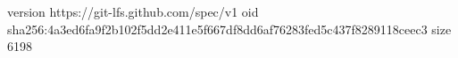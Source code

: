 version https://git-lfs.github.com/spec/v1
oid sha256:4a3ed6fa9f2b102f5dd2e411e5f667df8dd6af76283fed5c437f8289118ceec3
size 6198

